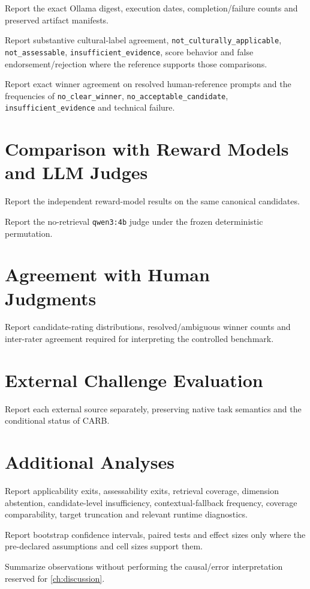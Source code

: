 Report the exact Ollama digest, execution dates, completion/failure counts and preserved artifact manifests.

Report substantive cultural-label agreement, \texttt{not\_culturally\_applicable}, \texttt{not\_assessable}, \texttt{insufficient\_evidence}, score behavior and false endorsement/rejection where the reference supports those comparisons.

Report exact winner agreement on resolved human-reference prompts and the frequencies of \texttt{no\_clear\_winner}, \texttt{no\_acceptable\_candidate}, \texttt{insufficient\_evidence} and technical failure.

\section{Comparison with Reward Models and LLM Judges}
Report the independent reward-model results on the same canonical candidates.

Report the no-retrieval \texttt{qwen3:4b} judge under the frozen deterministic permutation.

\section{Agreement with Human Judgments}
Report candidate-rating distributions, resolved/ambiguous winner counts and inter-rater agreement required for interpreting the controlled benchmark.

\section{External Challenge Evaluation}
Report each external source separately, preserving native task semantics and the conditional status of CARB.

\section{Additional Analyses}
Report applicability exits, assessability exits, retrieval coverage, dimension abstention, candidate-level insufficiency, contextual-fallback frequency, coverage comparability, target truncation and relevant runtime diagnostics.

Report bootstrap confidence intervals, paired tests and effect sizes only where the pre-declared assumptions and cell sizes support them.

Summarize observations without performing the causal/error interpretation reserved for \cref{ch:discussion}.
